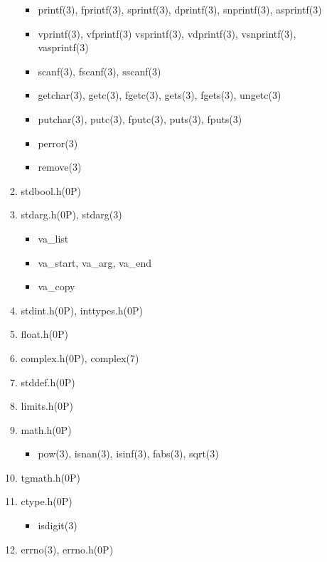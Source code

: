 \documentclass{article}
\begin{document}
\begin{enumerate}
\begin{enumerate}
\begin{itemize}
                    \item printf(3), fprintf(3), sprintf(3),
                          dprintf(3), snprintf(3), asprintf(3)
                    \item vprintf(3), vfprintf(3) vsprintf(3),
                          vdprintf(3), vsnprintf(3), vasprintf(3)
                    \item scanf(3), fscanf(3), sscanf(3)
                    \item getchar(3), getc(3), fgetc(3), gets(3), fgets(3), ungetc(3)
                    \item putchar(3), putc(3), fputc(3), puts(3), fputs(3)
                    \item perror(3)

                    \item remove(3)
                \end{itemize}
            \item stdbool.h(0P)
            \item stdarg.h(0P), stdarg(3)
                \begin{itemize}
                    \item va_list
                    \item va_start, va_arg, va_end
                    \item va_copy
                \end{itemize}
            \item stdint.h(0P), inttypes.h(0P)
            \item float.h(0P)
            \item complex.h(0P), complex(7)
            \item stddef.h(0P)
            \item limits.h(0P)
            \item math.h(0P)
                \begin{itemize}
                    \item pow(3), isnan(3), isinf(3), fabs(3), sqrt(3)
                \end{itemize}
            \item tgmath.h(0P)
            \item ctype.h(0P)
                \begin{itemize}
                    \item isdigit(3)
                \end{itemize}
            \item errno(3), errno.h(0P)

\end{enumerate}
\end{enumerate}
\end{document}
